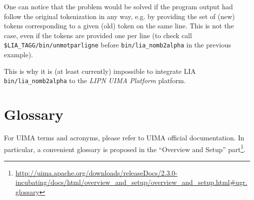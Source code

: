\documentclass{article}
\newcommand{\softName}{{\em LIPN UIMA Platform}\xspace}
\begin{document}
One can notice that the problem would be solved if the program output had follow the original tokenization in any way, e.g. by providing the set of (new) tokens corresponding to a given (old) token on the same line. This is not the case, even if the tokens are provided one per line (to check call {\tt \$LIA\_TAGG/bin/unmotparligne} before {\tt bin/lia\_nomb2alpha} in the previous example).

This is why it is (at least currently) impossible  to integrate LIA {\tt bin/lia\_nomb2alpha} to the \softName platform.


\section{Glossary}

For UIMA terms and acronyms, please refer to UIMA official documentation. In particular, a convenient glossary is proposed in the ``Overview and Setup'' part\footnote{\url{http://uima.apache.org/downloads/releaseDocs/2.3.0-incubating/docs/html/overview_and_setup/overview_and_setup.html\#ugr.glossary}}.
\end{document}
